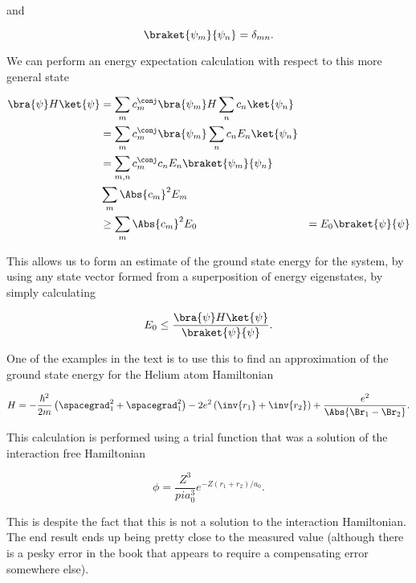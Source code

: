 and

\begin{equation}\label{eqn:variationHarmonicOscillator:50}
\braket{\psi_m}{\psi_n} = \delta_{mn}.
\end{equation}

We can perform an energy expectation calculation with respect to this more general state

\begin{align*}
\bra{\psi} H \ket{\psi} 
&= 
\sum_m c_{m}^\conj \bra{\psi_m} 
H
\sum_n c_{n} \ket{\psi_n} \\
&=
\sum_m c_{m}^\conj \bra{\psi_m}
\sum_n c_{n} E_n \ket{\psi_n} \\
&=
\sum_{m,n} c_{m}^\conj c_n E_n \braket{\psi_m}{\psi_n} \\
&
\sum_{m} \Abs{c_{m}}^2 E_m \\
&\ge
\sum_{m} \Abs{c_{m}}^2 E_0
&=
E_0 \braket{\psi}{\psi}
\end{align*}

This allows us to form an estimate of the ground state energy for the system, by using any state vector formed from a superposition of energy eigenstates, by simply calculating

\begin{equation}\label{eqn:variationHarmonicOscillator:70}
E_0 \le \frac{\bra{\psi} H \ket{\psi}}{ \braket{\psi}{\psi} }.
\end{equation}

One of the examples in the text is to use this to find an approximation of the ground state energy for the Helium atom Hamiltonian

\begin{equation}\label{eqn:variationHarmonicOscillator:90}
H = 
-\frac{\hbar^2}{2m} \left( 
\spacegrad_1^2
+\spacegrad_1^2\right) - 2 e^2 \left( \inv{r_1} + \inv{r_2} \right) + \frac{e^2}{\Abs{\Br_1 - \Br_2}}.
\end{equation}

This calculation is performed using a trial function that was a solution of the interaction free Hamiltonian

\begin{equation}\label{eqn:variationHarmonicOscillator:110}
\phi = \frac{Z^3}{pi a_0^3} e^{-Z (r_1 + r_2)/a_0 }.
\end{equation}

This is despite the fact that this is not a solution to the interaction Hamiltonian.  The end result ends up being pretty close to the measured value (although there is a pesky error in the book that appears to require a compensating error somewhere else).


